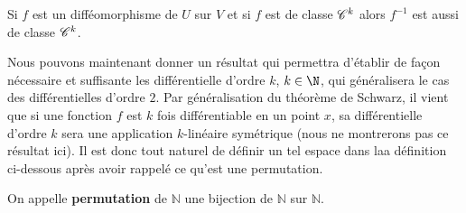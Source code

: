 \documentclass[class=report,crop=false]{standalone}
\begin{document}
\begin{theoreme}
\textcolor[rgb]{0.44,0.00,0.87}{
  Si $f$ est un diff\'eomorphisme de $U$ sur $V$ et si $f$ est de classe $\mathscr{C}^k$ alors $f^{-1}$ est aussi de classe $\mathscr{C}^k$.
 }
\end{theoreme}

\noindent Nous pouvons maintenant donner un résultat qui permettra d'établir de façon nécessaire et suffisante les différentielle d'ordre $k$, $k \in  \N$, qui généralisera le cas des différentielles d'ordre $2$. Par généralisation du théorème de Schwarz, il vient que si
une fonction  $f$ est $k$ fois différentiable en un point $x$, sa différentielle d'ordre $k$  sera une application $k$-linéaire
symétrique (nous ne montrerons pas ce résultat ici). Il est donc tout naturel de définir un tel espace dans laa définition ci-dessous
après avoir rappelé ce qu'est une permutation.
 

\begin{definition}[PERMUTATION]
\textcolor[rgb]{0.73,0.00,0.00}{On appelle {\bf permutation} de $\mathbb{N}$ une bijection de $\mathbb{N}$ sur
$\mathbb{N}$.
}
 \end{definition}
\end{document}
